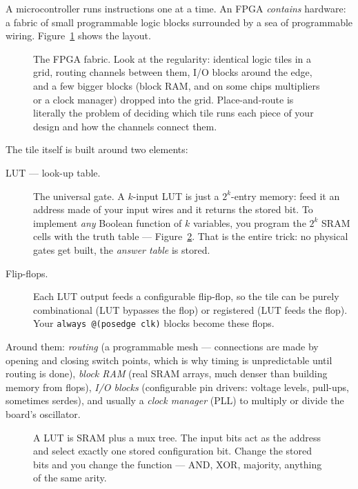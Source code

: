 A microcontroller runs instructions one at a time. An FPGA \emph{contains}
hardware: a fabric of small programmable logic blocks surrounded by a sea of
programmable wiring. Figure~\ref{fig:fabric} shows the layout.

\begin{figure}[htbp]\centering

\caption{The FPGA fabric. Look at the regularity: identical logic tiles in a
grid, routing channels between them, I/O blocks around the edge, and a few
bigger blocks (block RAM, and on some chips multipliers or a clock manager)
dropped into the grid. Place-and-route is literally the problem of deciding
which tile runs each piece of your design and how the channels connect them.}
\label{fig:fabric}
\end{figure}

The tile itself is built around two elements:

\begin{description}
\item[LUT --- look-up table.] The universal gate. A $k$-input LUT is just a
$2^k$-entry memory: feed it an address made of your input wires and it returns
the stored bit. To implement \emph{any} Boolean function of $k$ variables, you
program the $2^k$ SRAM cells with the truth table --- Figure~\ref{fig:lut}.
That is the entire trick: no physical gates get built, the \emph{answer table}
is stored.
\item[Flip-flops.] Each LUT output feeds a configurable flip-flop, so the tile
can be purely combinational (LUT bypasses the flop) or registered (LUT feeds
the flop). Your \texttt{always @(posedge clk)} blocks become these flops.
\end{description}

Around them: \emph{routing} (a programmable mesh --- connections are made by
opening and closing switch points, which is why timing is unpredictable until
routing is done), \emph{block RAM} (real SRAM arrays, much denser than building
memory from flops), \emph{I/O blocks} (configurable pin drivers: voltage
levels, pull-ups, sometimes serdes), and usually a \emph{clock manager} (PLL)
to multiply or divide the board's oscillator.

\begin{figure}[htbp]\centering

\caption{A LUT is SRAM plus a mux tree. The input bits act as the address and
select exactly one stored configuration bit. Change the stored bits and you
change the function --- AND, XOR, majority, anything of the same arity.}
\label{fig:lut}
\end{figure}

